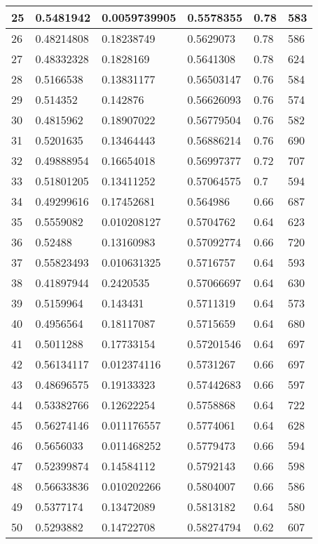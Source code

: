 \begin{longtable}{|l|l|l|l|l|l|}
25 & 0.5481942 & 0.0059739905 & 0.5578355 & 0.78 & 583 \\ \hline 
26 & 0.48214808 & 0.18238749 & 0.5629073 & 0.78 & 586 \\ \hline 
27 & 0.48332328 & 0.1828169 & 0.5641308 & 0.78 & 624 \\ \hline 
28 & 0.5166538 & 0.13831177 & 0.56503147 & 0.76 & 584 \\ \hline 
29 & 0.514352 & 0.142876 & 0.56626093 & 0.76 & 574 \\ \hline 
30 & 0.4815962 & 0.18907022 & 0.56779504 & 0.76 & 582 \\ \hline 
31 & 0.5201635 & 0.13464443 & 0.56886214 & 0.76 & 690 \\ \hline 
32 & 0.49888954 & 0.16654018 & 0.56997377 & 0.72 & 707 \\ \hline 
33 & 0.51801205 & 0.13411252 & 0.57064575 & 0.7 & 594 \\ \hline 
34 & 0.49299616 & 0.17452681 & 0.564986 & 0.66 & 687 \\ \hline 
35 & 0.5559082 & 0.010208127 & 0.5704762 & 0.64 & 623 \\ \hline 
36 & 0.52488 & 0.13160983 & 0.57092774 & 0.66 & 720 \\ \hline 
37 & 0.55823493 & 0.010631325 & 0.5716757 & 0.64 & 593 \\ \hline 
38 & 0.41897944 & 0.2420535 & 0.57066697 & 0.64 & 630 \\ \hline 
39 & 0.5159964 & 0.143431 & 0.5711319 & 0.64 & 573 \\ \hline 
40 & 0.4956564 & 0.18117087 & 0.5715659 & 0.64 & 680 \\ \hline 
41 & 0.5011288 & 0.17733154 & 0.57201546 & 0.64 & 697 \\ \hline 
42 & 0.56134117 & 0.012374116 & 0.5731267 & 0.66 & 697 \\ \hline 
43 & 0.48696575 & 0.19133323 & 0.57442683 & 0.66 & 597 \\ \hline 
44 & 0.53382766 & 0.12622254 & 0.5758868 & 0.64 & 722 \\ \hline 
45 & 0.56274146 & 0.011176557 & 0.5774061 & 0.64 & 628 \\ \hline 
46 & 0.5656033 & 0.011468252 & 0.5779473 & 0.66 & 594 \\ \hline 
47 & 0.52399874 & 0.14584112 & 0.5792143 & 0.66 & 598 \\ \hline 
48 & 0.56633836 & 0.010202266 & 0.5804007 & 0.66 & 586 \\ \hline 
49 & 0.5377174 & 0.13472089 & 0.5813182 & 0.64 & 580 \\ \hline 
50 & 0.5293882 & 0.14722708 & 0.58274794 & 0.62 & 607 \\ \hline 
\end{longtable}